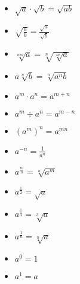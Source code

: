 \begin{itemize}

    \item \(\sqrt{a} \cdot \sqrt{b} = \sqrt{ab}\)

    \item \(\sqrt{\frac{a}{b}} = \frac{\sqrt{a}}{\sqrt{b}}\)

    \item \(\sqrt[nm]{a} = \sqrt[n]{\sqrt[m]{a}}\)

    \item \(a\sqrt[n]{b} = \sqrt[n]{a^n b}\)

    \item \(a^m \cdot a^n = a^{m+n}\)

    \item \(a^m \div a^n = a^{m-n}\)

    \item \({(a^m)}^n = a^{mn}\)

    \item \(a^{-n} = \frac{1}{a^n}\)

    \item \(a^{\frac{m}{n}} = \sqrt[n]{a^m}\)

    \item \(a^{\frac{1}{2}} = \sqrt{a}\)

    \item \(a^{\frac{1}{3}} = \sqrt[3]{a}\)

    \item \(a^{\frac{1}{n}} = \sqrt[n]{a}\)

    \item \(a^0 = 1\)

    \item \(a^1 = a\)

\end{itemize}
